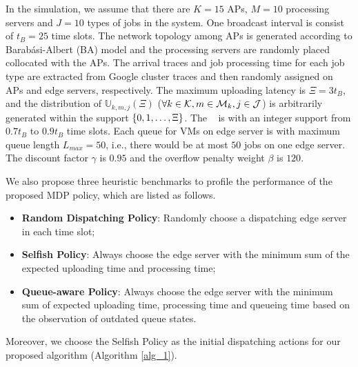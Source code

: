 In the simulation, we assume that there are $K=15$ APs, $M=10$ processing servers and $J=10$ types of jobs in the system.
One broadcast interval is consist of $t_{B}=25$ time slots.
The network topology among APs is generated according to Barab\'asi-Albert (BA) model \cite{albert1999diameter} and the processing servers are randomly placed collocated with the APs.
The arrival traces and job processing time for each job type are extracted from Google cluster traces \cite{clusterdata:Reiss2011} and then randomly assigned on APs and edge servers, respectively.
The maximum uploading latency is $\Xi = 3t_B$, and the distribution of $\mathbb{U}_{k,m,j}(\Xi)$ ($\forall k\in\mathcal{K}, m\in\mathcal{M}_{k}, j\in\mathcal{J}$) is arbitrarily generated within the support $\{0, 1, \dots, \Xi\}$.
The \brlatency~ is with an integer support from $0.7t_B$ to $0.9t_B$ time slots.
Each queue for VMs on edge server is with maximum queue length $L_{max}=50$, i.e., there would be at most $50$ jobs on one edge server.
The discount factor $\gamma$ is $0.95$ and the overflow penalty weight $\beta$ is $120$.


We also propose {three heuristic benchmarks to profile the performance of the proposed MDP policy}, which are listed as follows.
\begin{itemize}
    \item \textbf{Random Dispatching Policy}:
            Randomly choose a dispatching edge server in each time slot; 
    \item \textbf{Selfish Policy}:
            Always choose the edge server with the minimum sum of the expected uploading time and processing time;
    \item \textbf{Queue-aware Policy}:
            Always choose the edge server with the minimum sum of expected uploading time, processing time and queueing time based on the observation of outdated queue states.
\end{itemize}
Moreover, we choose the Selfish Policy as the initial dispatching actions for our proposed algorithm (Algorithm \ref{alg_1}).


